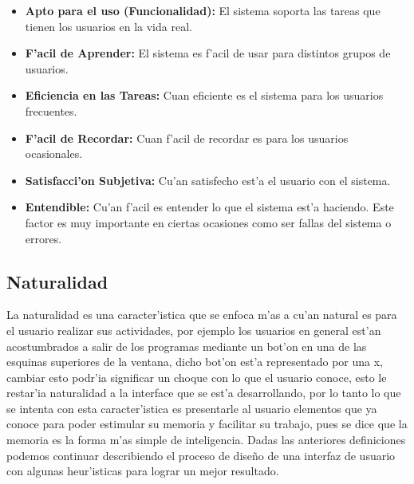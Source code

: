 \begin{itemize}
	\item \textbf{ Apto para el uso (Funcionalidad): } El sistema soporta las tareas que tienen los usuarios en la vida real.
	
	\item \textbf{F'acil de Aprender:} El sistema es f'acil de usar para distintos grupos de usuarios.

	\item \textbf{Eficiencia en las Tareas:} Cuan eficiente es el sistema para los usuarios frecuentes.

	\item \textbf{F'acil de Recordar:} Cuan f'acil de recordar es para los usuarios ocasionales.

	\item \textbf{Satisfacci'on Subjetiva:} Cu'an satisfecho est'a el usuario con el sistema.
	
	\item \textbf{Entendible:} Cu'an f'acil es entender lo que el sistema est'a haciendo. Este factor es muy importante en ciertas ocasiones como ser fallas del sistema o errores.
\end{itemize}

\medskip

\subsection{Naturalidad}
La naturalidad es una caracter'istica que se enfoca m'as a cu'an natural es para el usuario realizar sus actividades, por ejemplo los usuarios en general est'an acostumbrados a salir de los programas mediante un bot'on en una de las esquinas superiores de la ventana, dicho bot'on est'a representado por una x, cambiar esto podr'ia significar un choque con lo que el usuario conoce, esto le restar'ia naturalidad a la interface que se est'a desarrollando, por lo tanto lo que se intenta con esta caracter'istica es presentarle al usuario elementos que ya conoce para poder estimular su memoria y facilitar su trabajo, pues se dice que la memoria es la forma m'as simple de inteligencia.
Dadas las anteriores definiciones podemos continuar describiendo el proceso de dise\~no de una interfaz de usuario con algunas heur'isticas para lograr un mejor resultado.

